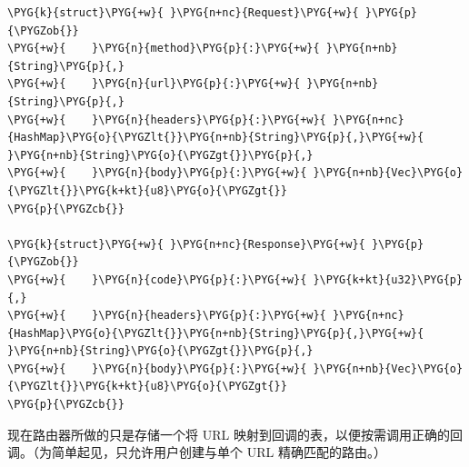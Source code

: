 \begin{Verbatim}[commandchars=\\\{\},breaklines=true,breakanywhere=true,fontsize=\codefont,xleftmargin=17bp]
\PYG{k}{struct}\PYG{+w}{ }\PYG{n+nc}{Request}\PYG{+w}{ }\PYG{p}{\PYGZob{}}
\PYG{+w}{    }\PYG{n}{method}\PYG{p}{:}\PYG{+w}{ }\PYG{n+nb}{String}\PYG{p}{,}
\PYG{+w}{    }\PYG{n}{url}\PYG{p}{:}\PYG{+w}{ }\PYG{n+nb}{String}\PYG{p}{,}
\PYG{+w}{    }\PYG{n}{headers}\PYG{p}{:}\PYG{+w}{ }\PYG{n+nc}{HashMap}\PYG{o}{\PYGZlt{}}\PYG{n+nb}{String}\PYG{p}{,}\PYG{+w}{ }\PYG{n+nb}{String}\PYG{o}{\PYGZgt{}}\PYG{p}{,}
\PYG{+w}{    }\PYG{n}{body}\PYG{p}{:}\PYG{+w}{ }\PYG{n+nb}{Vec}\PYG{o}{\PYGZlt{}}\PYG{k+kt}{u8}\PYG{o}{\PYGZgt{}}
\PYG{p}{\PYGZcb{}}

\PYG{k}{struct}\PYG{+w}{ }\PYG{n+nc}{Response}\PYG{+w}{ }\PYG{p}{\PYGZob{}}
\PYG{+w}{    }\PYG{n}{code}\PYG{p}{:}\PYG{+w}{ }\PYG{k+kt}{u32}\PYG{p}{,}
\PYG{+w}{    }\PYG{n}{headers}\PYG{p}{:}\PYG{+w}{ }\PYG{n+nc}{HashMap}\PYG{o}{\PYGZlt{}}\PYG{n+nb}{String}\PYG{p}{,}\PYG{+w}{ }\PYG{n+nb}{String}\PYG{o}{\PYGZgt{}}\PYG{p}{,}
\PYG{+w}{    }\PYG{n}{body}\PYG{p}{:}\PYG{+w}{ }\PYG{n+nb}{Vec}\PYG{o}{\PYGZlt{}}\PYG{k+kt}{u8}\PYG{o}{\PYGZgt{}}
\PYG{p}{\PYGZcb{}}
\end{Verbatim}

现在路由器所做的只是存储一个将 URL 映射到回调的表，以便按需调用正确的回调。（为简单起见，只允许用户创建与单个 URL 精确匹配的路由。）

